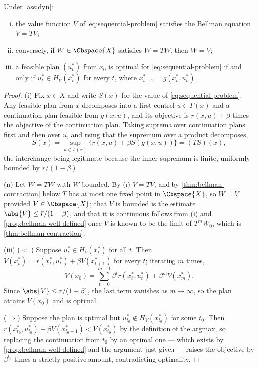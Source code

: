 \begin{theorem}\label{thm:principle-of-optimality}
	Under \autoref{ass:dyn}:
	\begin{enumerate}[(i)]
		\item the value function $V$ of \eqref{eq:sequential-problem} satisfies the
		      Bellman equation $V=TV$;
		\item conversely, if $W\in\Cbspace{X}$ satisfies $W=TW$, then $W=V$;
		\item a feasible plan $(u_t^{\ast})$ from $x_0$ is optimal for
		      \eqref{eq:sequential-problem} if and only if
		      $u_t^{\ast}\in H_V(x_t^{\ast})$ for every $t$, where
		      $x_{t+1}^{\ast}=g(x_t^{\ast},u_t^{\ast})$.
	\end{enumerate}
\end{theorem}

\begin{proof}
	(i) Fix $x\in X$ and write $S(x)$ for the value of
	\eqref{eq:sequential-problem}. Any feasible plan from $x$ decomposes into a
	first control $u\in\Gamma(x)$ and a continuation plan feasible from
	$g(x,u)$, and its objective is $r(x,u)+\beta$ times the objective of the
	continuation plan. Taking suprema over continuation plans first and then over
	$u$, and using that the supremum over a product decomposes,
	\[
		S(x)=\sup_{u\in\Gamma(x)}\bigl\{r(x,u)+\beta S(g(x,u))\bigr\}=(TS)(x),
	\]
	the interchange being legitimate because the inner supremum is finite,
	uniformly bounded by $\bar r/(1-\beta)$.

	(ii) Let $W=TW$ with $W$ bounded. By (i) $V=TV$, and by
	\autoref{thm:bellman-contraction} below $T$ has at most one fixed point in
	$\Cbspace{X}$, so $W=V$ provided $V\in\Cbspace{X}$; that $V$ is bounded is
	the estimate $\abs{V}\leq\bar r/(1-\beta)$, and that it is continuous follows
	from (i) and \autoref{prop:bellman-well-defined} once $V$ is known to be the
	limit of $T^{m}W_0$, which is \autoref{thm:bellman-contraction}.

	(iii) ($\Leftarrow$) Suppose $u_t^{\ast}\in H_V(x_t^{\ast})$ for all $t$. Then
	$V(x_t^{\ast})=r(x_t^{\ast},u_t^{\ast})+\beta V(x_{t+1}^{\ast})$ for every $t$;
	iterating $m$ times,
	\begin{equation}\label{eq:value-unrolled}
		V(x_0)=\sum_{t=0}^{m-1}\beta^{t}r(x_t^{\ast},u_t^{\ast})
		+\beta^{m}V(x_m^{\ast}).
	\end{equation}
	Since $\abs{V}\leq\bar r/(1-\beta)$, the last term vanishes as $m\to\infty$, so
	the plan attains $V(x_0)$ and is optimal.

	($\Rightarrow$) Suppose the plan is optimal but
	$u_{t_0}^{\ast}\notin H_V(x_{t_0}^{\ast})$ for some $t_0$. Then
	$r(x_{t_0}^{\ast},u_{t_0}^{\ast})+\beta V(x_{t_0+1}^{\ast})<V(x_{t_0}^{\ast})$
	by the definition of the argmax, so replacing the continuation from $t_0$ by an
	optimal one --- which exists by
	\autoref{prop:bellman-well-defined} and the argument just given --- raises the
	objective by $\beta^{t_0}$ times a strictly positive amount, contradicting
	optimality.
\end{proof}

